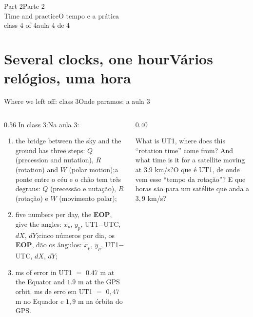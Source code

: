 \documentclass[aspectratio=169,11pt]{beamer}
\newcommand{\tr}[2]{\ifEN#2\else#1\fi}
\newcommand{\bnum}[1]{\textbf{\textcolor{mTeal}{#1}}}
\begin{document}
\begin{frame}[standout]
  \tr{Parte 2}{Part 2}\\[6pt]
  {\normalsize \tr{O tempo e a prática}{Time and practice}}\\[4pt]
  {\scriptsize \tr{aula 4 de 4}{class 4 of 4}}
\end{frame}

\section{\tr{Vários relógios, uma hora}{Several clocks, one hour}}

\begin{frame}{\tr{Onde paramos: a aula 3}{Where we left off: class 3}}
  \begin{columns}[T]
    \begin{column}{0.56\textwidth}
      \small
      \tr{Na aula 3:}{In class 3:}
      \begin{enumerate}
        \setlength{\itemsep}{4pt}
        \item \tr{a ponte entre o céu e o chão tem três degraus: $Q$ (precessão e nutação), $R$ (rotação) e $W$ (movimento polar);}{the bridge between the sky and the ground has three steps: $Q$ (precession and nutation), $R$ (rotation) and $W$ (polar motion);}
        \item \tr{cinco números por dia, os \bnum{EOP}, dão os ângulos: $x_p$, $y_p$, UT1$-$UTC, $dX$, $dY$;}{five numbers per day, the \bnum{EOP}, give the angles: $x_p$, $y_p$, UT1$-$UTC, $dX$, $dY$;}
        \item \tr{1 ms de erro em UT1 $=$ $0{,}47$ m no Equador e $1{,}9$ m na órbita do GPS.}{1 ms of error in UT1 $=$ $0.47$ m at the Equator and $1.9$ m at the GPS orbit.}
      \end{enumerate}
    \end{column}
    \begin{column}{0.40\textwidth}
      \begin{cuidado}[title={\tr{A pergunta de hoje}{Today's question}}]
        \tr{O que é UT1, de onde vem esse ``tempo da rotação''? E que horas são \alert{para um satélite} que anda a $3{,}9$ km/s?}{What is UT1, where does this ``rotation time'' come from? And what time is it \alert{for a satellite} moving at $3.9$ km/s?}
      \end{cuidado}
    \end{column}
  \end{columns}
\end{frame}
\end{document}
